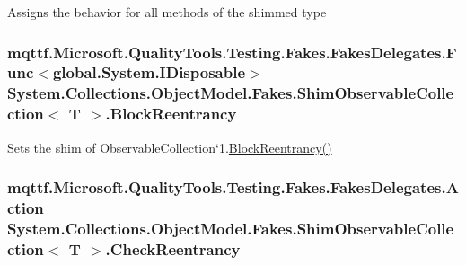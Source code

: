 Assigns the behavior for all methods of the shimmed type

\hypertarget{class_system_1_1_collections_1_1_object_model_1_1_fakes_1_1_shim_observable_collection_3_01_t_01_4_a695262d5aa2568068d76a183f739a9d4}{
\subsubsection[{Block\-Reentrancy}]{\setlength{\rightskip}{0pt plus 5cm}mqttf.\-Microsoft.\-Quality\-Tools.\-Testing.\-Fakes.\-Fakes\-Delegates.\-Func$<$global.\-System.\-I\-Disposable$>$ System.\-Collections.\-Object\-Model.\-Fakes.\-Shim\-Observable\-Collection$<$ T $>$.Block\-Reentrancy\hspace{0.3cm}{\ttfamily [set]}}}\label{class_system_1_1_collections_1_1_object_model_1_1_fakes_1_1_shim_observable_collection_3_01_t_01_4_a695262d5aa2568068d76a183f739a9d4}


Sets the shim of Observable\-Collection`1.\hyperlink{class_system_1_1_collections_1_1_object_model_1_1_fakes_1_1_shim_observable_collection_3_01_t_01_4_a695262d5aa2568068d76a183f739a9d4}{Block\-Reentrancy()}

\hypertarget{class_system_1_1_collections_1_1_object_model_1_1_fakes_1_1_shim_observable_collection_3_01_t_01_4_a13b074e6cd9cd946e8fd03e48ad31228}{
\subsubsection[{Check\-Reentrancy}]{\setlength{\rightskip}{0pt plus 5cm}mqttf.\-Microsoft.\-Quality\-Tools.\-Testing.\-Fakes.\-Fakes\-Delegates.\-Action System.\-Collections.\-Object\-Model.\-Fakes.\-Shim\-Observable\-Collection$<$ T $>$.Check\-Reentrancy\hspace{0.3cm}{\ttfamily [set]}}}\label{class_system_1_1_collections_1_1_object_model_1_1_fakes_1_1_shim_observable_collection_3_01_t_01_4_a13b074e6cd9cd946e8fd03e48ad31228}


